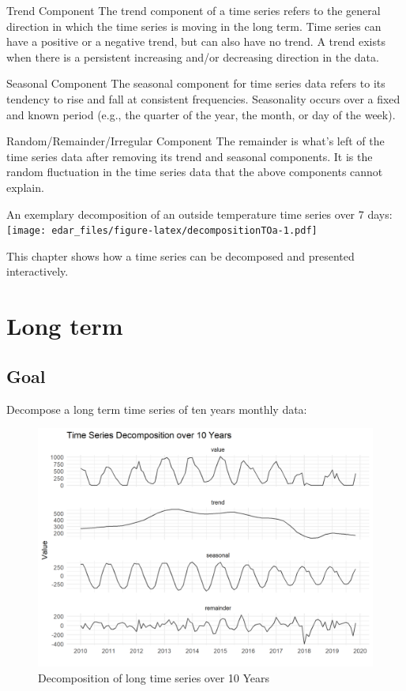 \documentclass[
  a4paperpaper,
]{book}
\begin{document}
Trend Component
The trend component of a time series refers to the general direction in which the time series is moving in the long term. Time series can have a positive or a negative trend, but can also have no trend.
A trend exists when there is a persistent increasing and/or decreasing direction in the data.

Seasonal Component
The seasonal component for time series data refers to its tendency to rise and fall at consistent frequencies. Seasonality occurs over a fixed and known period (e.g., the quarter of the year, the month, or day of the week).

Random/Remainder/Irregular Component
The remainder is what's left of the time series data after removing its trend and seasonal components. It is the random fluctuation in the time series data that the above components cannot explain.

An exemplary decomposition of an outside temperature time series over 7 days:
\texttt{[image: edar\_files/figure-latex/decompositionTOa-1.pdf]}

This chapter shows how a time series can be decomposed and presented interactively.

\newpage

\hypertarget{long-term}{%
\section{Long term}\label{long-term}}

\hypertarget{goal-4}{%
\subsection{Goal}\label{goal-4}}

Decompose a long term time series of ten years monthly data:

\begin{figure}
\includegraphics[width=0.7\linewidth]{images/plotDecompositionLong} \caption{Decomposition of long time series over 10 Years}\label{fig:unnamed-chunk-13}
\end{figure}
\end{document}
